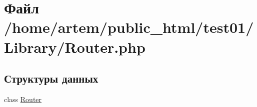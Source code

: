 \hypertarget{_router_8php}{\section{Файл /home/artem/public\-\_\-html/test01/\-Library/\-Router.php}
\label{_router_8php}
}
\subsection*{Структуры данных}
\begin{DoxyCompactItemize}
\item 
class \hyperlink{class_router}{Router}
\end{DoxyCompactItemize}
